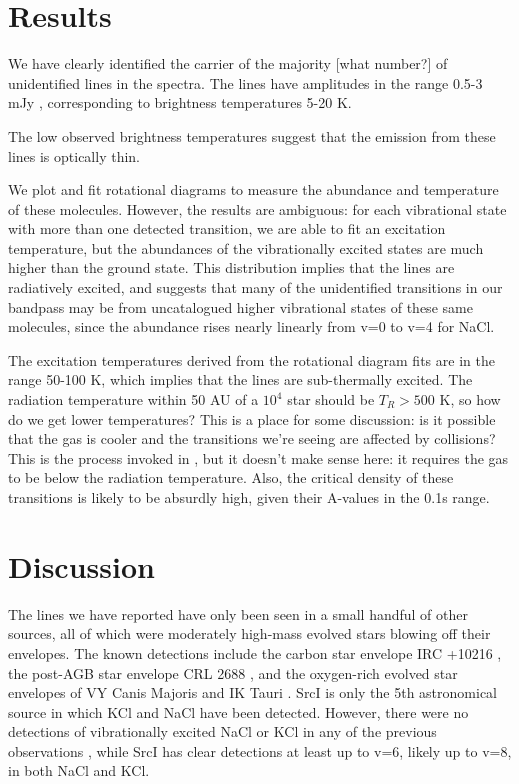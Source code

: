 \documentclass[twocolumn]{aastex62}
\newcommand{\sourcei}{SrcI\xspace}
\begin{document}
\section{Results}
We have clearly identified the carrier of the majority [what number?]
of unidentified lines in the \citet{Ginsburg2018a} spectra.
The lines have amplitudes in the range 0.5-3 mJy \perbeam, corresponding
to brightness temperatures 5-20 K.

The low observed brightness temperatures suggest that the emission from
these lines is optically thin.


We plot and fit rotational diagrams to measure the abundance and temperature of
these molecules.  However, the results are ambiguous: for each vibrational
state with more than one detected transition, we are able to fit an excitation
temperature, but the abundances of the vibrationally excited states are much
higher than the ground state.  This distribution implies that the lines are
radiatively excited, and suggests that many of the unidentified transitions in
our bandpass may be from uncatalogued higher vibrational states of these same
molecules, since the abundance rises nearly linearly from v=0 to v=4 for NaCl.

The excitation temperatures derived from the rotational diagram fits are in the
range 50-100 K, which implies that the lines are sub-thermally excited.  The
radiation temperature within 50 AU of a $10^4$ \lsun star should be $T_R>500$ K,
so how do we get lower temperatures?
{\color{red} This is a place for some discussion: is it possible that the gas
is cooler and the transitions we're seeing are affected by collisions?
This is the process invoked in \citet{Kaplan2017a}, but it doesn't make sense here:
it requires the gas to be below the radiation temperature.  Also, the critical density
of these transitions is likely to be absurdly high, given their A-values in the 0.1s
range.}

\section{Discussion}
The lines we have reported have only been seen in a small handful of other sources,
all of which were moderately high-mass evolved stars blowing off their envelopes.
The known detections include the carbon star envelope IRC +10216 \citep{Cernicharo1987a},
the post-AGB star envelope CRL 2688 \citep{Highberger2003a}, and the oxygen-rich
evolved star envelopes of VY Canis Majoris and IK Tauri \citep{Milam2007a}.
\sourcei is only the 5th astronomical source in which KCl and NaCl have been
detected.
However, there were no detections of vibrationally excited NaCl or KCl in any
of the previous observations \citep[][presented the most systematic study of salt
lines, which only included detections of v=0 rotational transitions]{Agundez2012a},
while \sourcei has clear detections at least up to v=6, likely up to v=8, in both
NaCl and KCl.
\end{document}
